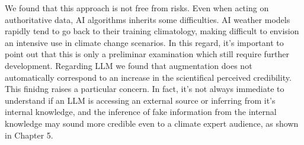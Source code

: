 We found that this approach is not free from risks. Even when acting on authoritative data, AI algorithms inherits some difficulties. AI weather models rapidly tend to go back to their training climatology, making difficult to envision an intensive use in climate change scenarios. In this regard, it's important to point out that this is only a preliminar examination which still require further development. Regarding LLM we found that augmentation does not automatically correspond to an increase in the scientifical perceived credibility. This finidng raises a particular concern. In fact, it's not always immediate to understand if an LLM is accessing an external source or inferring from it's internal knowledge, and the inference of fake information from the internal knowledge may sound more credible even to a climate expert audience, as shown in Chapter 5.